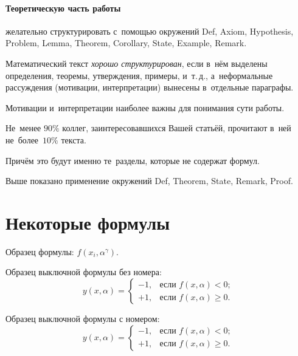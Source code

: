 \documentclass[12pt,twoside]{article}
\begin{document}
\paragraph{Теоретическую часть работы} желательно структурировать
с~помощью окружений
Def, Axiom, Hypothesis, Problem, Lemma, Theorem, Corollary, State, Example, Remark.

\begin{Def}
    Математический текст \emph{хорошо структурирован},
    если в~нём выделены определения, теоремы, утверждения, примеры, и~т.\,д.,
    а~неформальные рассуждения (мотивации, интерпретации)
    вынесены в~отдельные параграфы.
\end{Def}

\begin{State}
    Мотивации и~интерпретации наиболее важны для понимания сути работы.
\end{State}

\begin{Theorem}
    Не~менее $90\%$ коллег, заинтересовавшихся Вашей статьёй,
    прочитают в~ней не~более~$10\%$ текста.
\end{Theorem}

\begin{Proof}
    Причём это будут именно те~разделы, которые не содержат формул.
\end{Proof}

\begin{Remark}
    Выше показано применение окружений
    Def, Theorem, State, Remark, Proof.
\end{Remark}

\section{Некоторые формулы}

Образец формулы: $f(x_i,\alpha^\gamma)$.

Образец выключной формулы без номера:
\[
    y(x,\alpha) =
    \begin{cases}
        -1, & \text{если } f(x,\alpha)<0;  \\
        +1, & \text{если } f(x,\alpha)\geq 0.
    \end{cases}
\]

Образец выключной формулы с номером:
\begin{equation}
\label{eq:cases}
    y(x,\alpha) =
    \begin{cases}
        -1, & \text{если } f(x,\alpha)<0;  \\
        +1, & \text{если } f(x,\alpha)\geq 0.
    \end{cases}
\end{equation}
\end{document}
